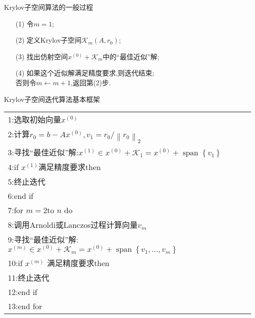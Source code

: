 \documentclass[notheorems,serif]{beamer}
\renewcommand{\normalsize}{\wuhao}
\newcommand{\wuhao}{\fontsize{10.5pt}{\baselineskip}\selectfont}
\begin{document}
\begin{frame}


{\color{blue}\Large Krylov子空间算法的一般过程}

\quad

\normalsize
\begin{itemize}
\item[(1)] 令$m=1$;
	\item[(2)] 定义Krylov子空间$\mathcal{K}_{m}\left(A, r_{0}\right)$;
	\item[(3)] 找出{\color{blue}仿射空间$x^{(0)}+\mathcal{K}_{m}$}中的“最佳近似”解;
	\item[(4)] 如果这个近似解满足精度要求,则迭代结束;\\
	否则令$m \leftarrow m+1$,返回第(2)步.
\end{itemize}
\end{frame}

\begin{frame}


{\color{blue}Krylov子空间迭代算法基本框架}
\begin{tabular}{l}
    \hline
	1:选取初始向量$x^{(0)}$\\
	2:计算$r_{0}=b-A x^{(0)}, v_{1}=r_{0} /\left\|r_{0}\right\|_{2}$\\
	3:寻找“最佳近似”解:$x^{(1)} \in x^{(0)}+\mathcal{K}_{1}=x^{(0)}+\operatorname{span}\left\{v_{1}\right\}$\\
	4:if $x^{(1)}$满足精度要求then\\
	5:\qquad 终止迭代\\
	6:end if\\
	7:for $m= 2$to $n$ do\\
	8:\qquad 调用Arnoldi或Lanczos过程计算向量$v_m$\\
	9:\qquad 寻找“最佳近似”解:$x^{(m)} \in x^{(0)}+\mathcal{K}_{m}=x^{(0)}+\operatorname{span}\left\{v_{1}, \ldots, v_{m}\right\}$\\
	10:\qquad if $x^{(m)}$ 满足精度要求then\\
	11:\qquad \qquad 终止迭代\\
	12:\qquad end if\\
	13:end for\\
	\hline
\end{tabular}
\end{frame}
\end{document}

